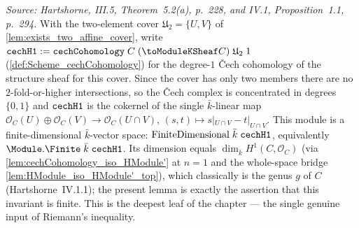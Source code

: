 \begin{lemma}
  \label{lem:cech_H1_two_affine_finiteDimensional}
  \textit{Source: Hartshorne, III.5, Theorem~5.2(a), p.~228, and IV.1,
  Proposition~1.1, p.~294.}
  With the two-element cover \(\mathfrak U_2 = \{U, V\}\) of
  \cref{lem:exists_two_affine_cover}, write \(\cechHI :=
  \mathtt{cechCohomology}\;C\;(\toModuleKSheaf C)\;\mathfrak U_2\;1\)
  (\cref{def:Scheme_cechCohomology}) for the degree-\(1\) Čech cohomology
  of the structure sheaf for this cover. Since the cover has only two
  members there are no \(2\)-fold-or-higher intersections, so the Čech
  complex is concentrated in degrees \(\{0, 1\}\) and \(\mathtt{cechH1}\) is the
  cokernel of the single \(\bar k\)-linear map
  \(\mathcal O_C(U) \oplus \mathcal O_C(V) \to \mathcal O_C(U \cap V)\),
  \((s, t) \mapsto s|_{U \cap V} - t|_{U \cap V}\). This module is a
  finite-dimensional \(\bar k\)-vector space:
  \(\mathrm{FiniteDimensional}\;\bar k\;\mathtt{cechH1}\), equivalently
  \(\Module.\Finite\;\bar k\;\cechHI\). Its dimension equals
  \(\dim_{\bar k} H^1(C, \mathcal O_C)\) (via
  \cref{lem:cechCohomology_iso_HModule'} at \(n = 1\) and the whole-space
  bridge \cref{lem:HModule_iso_HModule'_top}), which classically is the
  genus \(g\) of \(C\) (Hartshorne~IV.1.1); the present lemma is exactly
  the assertion that this invariant is finite. This is the deepest leaf
  of the chapter --- the single genuine input of Riemann's inequality.
\end{lemma}

